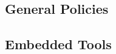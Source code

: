 \documentclass[fleqn]{article}
\begin{document}

\subsection{General Policies}\label{sec:genpol}


\subsection{Embedded Tools}\label{sec:tool}

\end{document}
